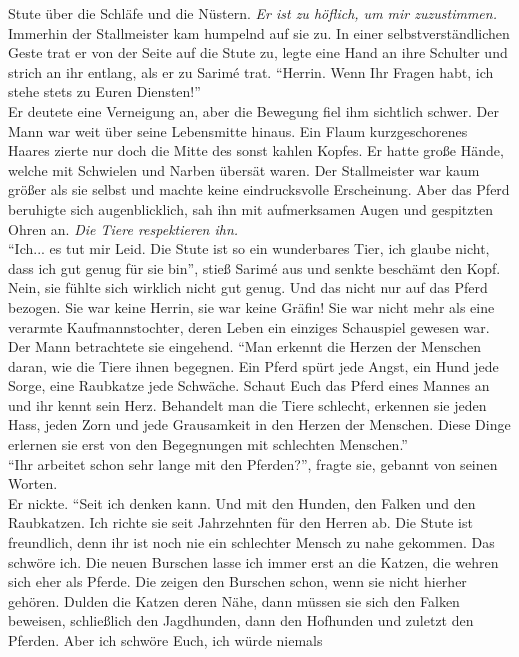 Stute über die Schläfe und die Nüstern. \textit{Er ist zu höflich, um mir zuzustimmen.}\\
Immerhin der Stallmeister kam humpelnd auf sie zu. In einer selbstverständlichen Geste trat er von 
der Seite auf die Stute zu, legte eine Hand an ihre Schulter und strich an ihr entlang, als er zu 
Sarimé trat. ``Herrin. Wenn Ihr Fragen habt, ich stehe stets zu Euren Diensten!''\\
Er deutete eine Verneigung an, aber die Bewegung fiel ihm sichtlich schwer. Der Mann war weit über 
seine Lebensmitte hinaus. Ein Flaum kurzgeschorenes Haares zierte nur doch die Mitte des sonst 
kahlen Kopfes. Er hatte große Hände, welche mit Schwielen und Narben übersät waren. Der 
Stallmeister war kaum größer als sie selbst und machte keine eindrucksvolle Erscheinung. Aber das 
Pferd beruhigte sich augenblicklich, sah ihn mit aufmerksamen Augen und gespitzten Ohren an.
\textit{Die Tiere respektieren ihn.}\\
``Ich... es tut mir Leid. Die Stute ist so ein wunderbares Tier, ich glaube nicht, dass ich gut 
genug für sie bin'', stieß Sarimé aus und senkte beschämt den Kopf. Nein, sie fühlte sich wirklich 
nicht gut genug. Und das nicht nur auf das Pferd bezogen. Sie war keine Herrin, sie war keine 
Gräfin! Sie war nicht mehr als eine verarmte Kaufmannstochter, deren Leben ein einziges Schauspiel 
gewesen war.
Der Mann betrachtete sie eingehend. ``Man erkennt die Herzen der Menschen daran, wie die Tiere 
ihnen begegnen. Ein Pferd spürt jede Angst, ein Hund jede Sorge, eine Raubkatze jede Schwäche. 
Schaut Euch das Pferd eines Mannes an und ihr kennt sein Herz. Behandelt man die Tiere schlecht, 
erkennen sie jeden Hass, jeden Zorn und jede Grausamkeit in den Herzen der Menschen. Diese Dinge 
erlernen sie erst von den Begegnungen mit schlechten Menschen.''\\
``Ihr arbeitet schon sehr lange mit den Pferden?'', fragte sie, gebannt von seinen Worten.\\
Er nickte. ``Seit ich denken kann. Und mit den Hunden, den Falken und den Raubkatzen. Ich richte 
sie seit Jahrzehnten für den Herren ab. Die Stute ist freundlich, denn ihr ist noch nie ein 
schlechter Mensch zu nahe gekommen. Das schwöre ich. Die neuen Burschen lasse ich immer erst an die 
Katzen, die wehren sich eher als Pferde. Die zeigen den Burschen schon, wenn sie nicht hierher 
gehören. Dulden die Katzen deren Nähe, dann müssen sie sich den Falken beweisen, schließlich den 
Jagdhunden, dann den Hofhunden und zuletzt den Pferden. Aber ich schwöre Euch, ich würde niemals 
